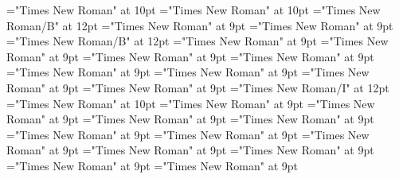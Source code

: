 \documentclass[gps1,twoside]{article}
\begin{document}
\font\paracontinuationsubentriesentry="Times New Roman" at 10pt
\font\subentrysubentriesentry="Times New Roman" at 10pt
\font\spanbzhheadwordsubentrysubentriesentry="Times New Roman/B" at 12pt
\font\headwordsubentrysubentriesentrybefore="Times New Roman" at 9pt
\font\spanheadwordsubentrysubentriesentrylastchildafter="Times New Roman" at 9pt
\font\spanheadwordsubentrysubentriesentry="Times New Roman/B" at 12pt
\font\complexformtypessubentrysubentriesentryafter="Times New Roman" at 9pt
\font\reverseabbrcomplexformtypecomplexformtypessubentrysubentriesentrybefore="Times New Roman" at 9pt
\font\pronunciationpronunciationpronunciationssubentrysubentriesentrybefore="Times New Roman" at 9pt
\font\pronunciationssubentrysubentriesentryafter="Times New Roman" at 9pt
\font\formpronunciationpronunciationssubentrysubentriesentrybefore="Times New Roman" at 9pt
\font\spanformpronunciationpronunciationssubentrysubentriesentryfirstchildbefore="Times New Roman" at 9pt
\font\spanformpronunciationpronunciationssubentrysubentriesentrylastchildafter="Times New Roman" at 9pt
\font\locationpronunciationpronunciationssubentrysubentriesentryafter="Times New Roman" at 9pt
\font\locationpronunciationpronunciationssubentrysubentriesentry="Times New Roman/I" at 12pt
\font\spanwritingsystemprefixspanabbreviationlocationpronunciationpronunciationssubentrysubentriesentry="Times New Roman" at 10pt
\font\spanwritingsystemprefixspanabbreviationlocationpronunciationpronunciationssubentrysubentriesentryafter="Times New Roman" at 9pt
\font\abbreviationlocationpronunciationpronunciationssubentrysubentriesentrybefore="Times New Roman" at 9pt
\font\spanabbreviationlocationpronunciationpronunciationssubentrysubentriesentrylastchildafter="Times New Roman" at 9pt
\font\namelocationpronunciationpronunciationssubentrysubentriesentrybefore="Times New Roman" at 9pt
\font\spannamelocationpronunciationpronunciationssubentrysubentriesentrylastchildafter="Times New Roman" at 9pt
\font\aliaslocationpronunciationpronunciationssubentrysubentriesentrybefore="Times New Roman" at 9pt
\font\spanaliaslocationpronunciationpronunciationssubentrysubentriesentrylastchildafter="Times New Roman" at 9pt
\font\variantformentrybackrefssubentrysubentriesentrybefore="Times New Roman" at 9pt
\font\variantformentrybackrefssubentrysubentriesentryafter="Times New Roman" at 9pt
\font\variantentrytypevariantentrytypevariantentrytypesvariantformentrybackrefvariantformentrybackrefssubentrysubentriesentrybefore="Times New Roman" at 9pt
\font\variantentrytypesvariantformentrybackrefvariantformentrybackrefssubentrysubentriesentryafter="Times New Roman" at 9pt
\end{document}
